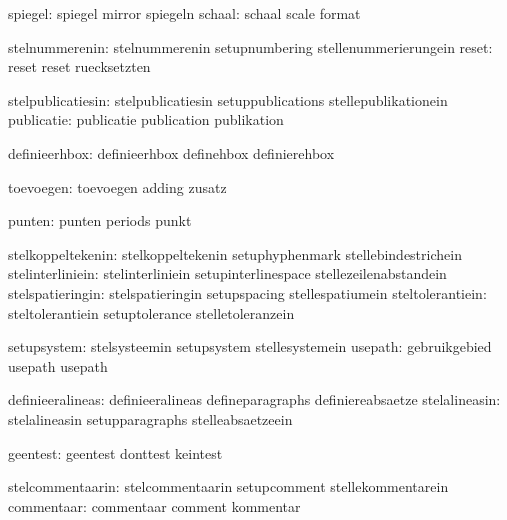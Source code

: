                       spiegel:  spiegel                      mirror
                                spiegeln
                       schaal:  schaal                       scale
                                format

               stelnummerenin:  stelnummerenin               setupnumbering
                                stellenummerierungein
                        reset:  reset                        reset
                                ruecksetzten

            stelpublicatiesin:  stelpublicatiesin            setuppublications
                                stellepublikationein
                   publicatie:  publicatie                   publication
                                publikation

                definieerhbox:  definieerhbox                definehbox
                                definierehbox

                    toevoegen:  toevoegen                    adding
                                zusatz

                       punten:  punten                       periods
                                punkt

            stelkoppeltekenin:  stelkoppeltekenin            setuphyphenmark
                                stellebindestrichein
             stelinterliniein:  stelinterliniein             setupinterlinespace
                                stellezeilenabstandein
             stelspatieringin:  stelspatieringin             setupspacing
                                stellespatiumein
             steltolerantiein:  steltolerantiein             setuptolerance
                                stelletoleranzein

                  setupsystem:  stelsysteemin                setupsystem
                                stellesystemein
                      usepath:  gebruikgebied                usepath 
                                usepath %

             definieeralineas:  definieeralineas             defineparagraphs
                                definiereabsaetze
                stelalineasin:  stelalineasin                setupparagraphs
                                stelleabsaetzeein

                     geentest:  geentest                     donttest
                                keintest

             stelcommentaarin:  stelcommentaarin             setupcomment
                                stellekommentarein
                   commentaar:  commentaar                   comment
                                kommentar

